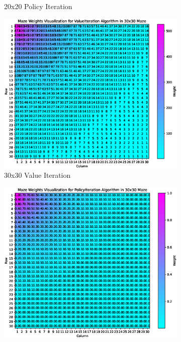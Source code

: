 \documentclass{article}
\begin{document}
\begin{figure}[hp]
\begin{subfigure}[b]{0.48\textwidth}
        \caption{20x20 Policy Iteration}
    \end{subfigure}
    \newline
    \begin{subfigure}[b]{0.48\textwidth}
        \centering
        \includegraphics[width=\textwidth]{imgs/ValueIteration-30-30.eps}
        \caption{30x30 Value Iteration}
    \end{subfigure}
    \begin{subfigure}[b]{0.48\textwidth}
        \centering
        \includegraphics[width=\textwidth]{imgs/PolicyIteration-30-30.eps}

\end{subfigure}
\end{figure}
\end{document}
